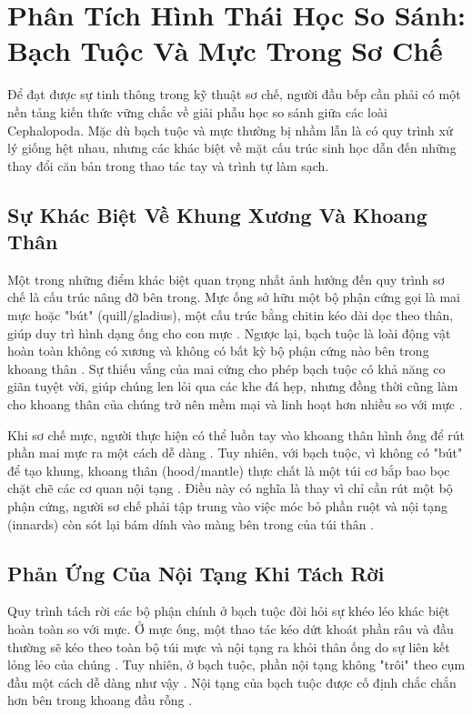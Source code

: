 \documentclass[12pt,a4paper]{report}
\begin{document}
\section{Phân Tích Hình Thái Học So Sánh: Bạch Tuộc Và Mực Trong Sơ Chế}

Để đạt được sự tinh thông trong kỹ thuật sơ chế, người đầu bếp cần phải có một nền tảng kiến thức vững chắc về giải phẫu học so sánh giữa các loài Cephalopoda. Mặc dù bạch tuộc và mực thường bị nhầm lẫn là có quy trình xử lý giống hệt nhau, nhưng các khác biệt về mặt cấu trúc sinh học dẫn đến những thay đổi căn bản trong thao tác tay và trình tự làm sạch.

\subsection{Sự Khác Biệt Về Khung Xương Và Khoang Thân}

Một trong những điểm khác biệt quan trọng nhất ảnh hưởng đến quy trình sơ chế là cấu trúc nâng đỡ bên trong. Mực ống sở hữu một bộ phận cứng gọi là mai mực hoặc "bút" (quill/gladius), một cấu trúc bằng chitin kéo dài dọc theo thân, giúp duy trì hình dạng ống cho con mực \cite{ref5}. Ngược lại, bạch tuộc là loài động vật hoàn toàn không có xương và không có bất kỳ bộ phận cứng nào bên trong khoang thân \cite{ref7}. Sự thiếu vắng của mai cứng cho phép bạch tuộc có khả năng co giãn tuyệt vời, giúp chúng len lỏi qua các khe đá hẹp, nhưng đồng thời cũng làm cho khoang thân của chúng trở nên mềm mại và linh hoạt hơn nhiều so với mực \cite{ref7}.

Khi sơ chế mực, người thực hiện có thể luồn tay vào khoang thân hình ống để rút phần mai mực ra một cách dễ dàng \cite{ref10}. Tuy nhiên, với bạch tuộc, vì không có "bút" để tạo khung, khoang thân (hood/mantle) thực chất là một túi cơ bắp bao bọc chặt chẽ các cơ quan nội tạng \cite{ref7}. Điều này có nghĩa là thay vì chỉ cần rút một bộ phận cứng, người sơ chế phải tập trung vào việc móc bỏ phần ruột và nội tạng (innards) còn sót lại bám dính vào màng bên trong của túi thân \cite{ref1}.

\subsection{Phản Ứng Của Nội Tạng Khi Tách Rời}

Quy trình tách rời các bộ phận chính ở bạch tuộc đòi hỏi sự khéo léo khác biệt hoàn toàn so với mực. Ở mực ống, một thao tác kéo dứt khoát phần râu và đầu thường sẽ kéo theo toàn bộ túi mực và nội tạng ra khỏi thân ống do sự liên kết lỏng lẻo của chúng \cite{ref1}. Tuy nhiên, ở bạch tuộc, phần nội tạng không "trôi" theo cụm đầu một cách dễ dàng như vậy \cite{ref1}. Nội tạng của bạch tuộc được cố định chắc chắn hơn bên trong khoang đầu rỗng \cite{ref12}.
\end{document}
